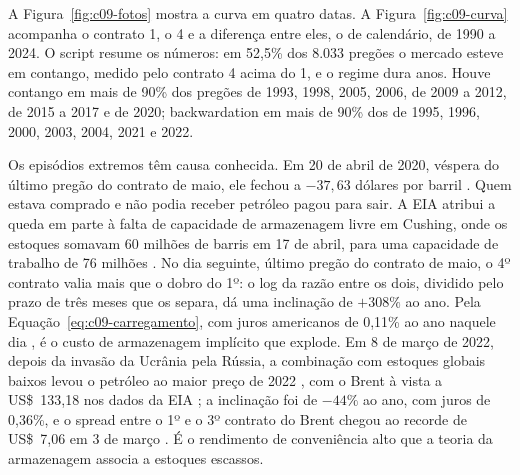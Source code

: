 
A Figura~\ref{fig:c09-fotos} mostra a curva em quatro datas. A Figura~\ref{fig:c09-curva} acompanha o contrato 1, o 4 e a diferença entre eles, o  de calendário, de 1990 a 2024. O script  resume os números: em 52,5\% dos 8.033 pregões o mercado esteve em contango, medido pelo contrato 4 acima do 1, e o regime dura anos. Houve contango em mais de 90\% dos pregões de 1993, 1998, 2005, 2006, de 2009 a 2012, de 2015 a 2017 e de 2020; backwardation em mais de 90\% dos de 1995, 1996, 2000, 2003, 2004, 2021 e 2022.


Os episódios extremos têm causa conhecida. Em 20 de abril de 2020, véspera do último pregão do contrato de maio, ele fechou a $-37,63$ dólares por barril \citep{cftc2020}. Quem estava comprado e não podia receber petróleo pagou para sair. A EIA atribui a queda em parte à falta de capacidade de armazenagem livre em Cushing, onde os estoques somavam 60 milhões de barris em 17 de abril, para uma capacidade de trabalho de 76 milhões \citep{eia2020a, eia2020b}. No dia seguinte, último pregão do contrato de maio, o 4º contrato valia mais que o dobro do 1º: o log da razão entre os dois, dividido pelo prazo de três meses que os separa, dá uma inclinação de $+308\%$ ao ano. Pela Equação~\eqref{eq:c09-carregamento}, com juros americanos de 0,11\% ao ano naquele dia \citep{fred2026}, é o custo de armazenagem implícito que explode. Em 8 de março de 2022, depois da invasão da Ucrânia pela Rússia, a combinação com estoques globais baixos levou o petróleo ao maior preço de 2022 \citep{eia2023}, com o Brent à vista a US\$~133,18 nos dados da EIA \citep{eia2026dados}; a inclinação foi de $-44\%$ ao ano, com juros de 0,36\%, e o spread entre o 1º e o 3º contrato do Brent chegou ao recorde de US\$~7,06 em 3 de março \citep{eia2022}. É o rendimento de conveniência alto que a teoria da armazenagem associa a estoques escassos.

